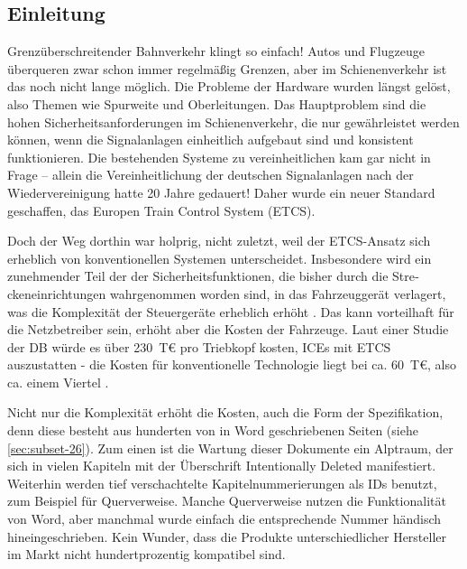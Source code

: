 \documentclass[twoside]{article}
\begin{document}
\begin{multicols}{2}
\noindent 

\section{Einleitung}

Grenzüberschreitender Bahnverkehr klingt so einfach! Autos und Flugzeuge überqueren zwar schon immer regelmäßig Grenzen, aber im Schienenverkehr ist das noch nicht lange möglich.  Die Probleme der Hardware wurden längst gelöst, also Themen wie Spurweite und Oberleitungen.  Das Hauptproblem sind die hohen Sicherheitsanforderungen im Schienenverkehr, die nur gewährleistet werden können, wenn die Signalanlagen einheitlich aufgebaut sind und konsistent funktionieren.  Die bestehenden Systeme zu vereinheitlichen kam gar nicht in Frage -- allein die Vereinheitlichung der deutschen Signalanlagen nach der Wiedervereinigung hatte 20 Jahre gedauert!  Daher wurde ein neuer Standard geschaffen, das Europen Train Control System (ETCS).

Doch der Weg dorthin war holprig, nicht zuletzt, weil der ETCS-Ansatz sich erheblich von konventionellen Systemen unterscheidet.  Insbesondere wird ein zunehmender Teil der der Sicher­heitsfunktionen, die bisher durch die Stre­ckeneinrichtungen wahrgenommen worden sind, in das Fahrzeuggerät verlagert, was die Komplexität der Steuergeräte erheblich erhöht \cite{Hase2011}.  Das kann vorteilhaft für die Netzbetreiber sein, erhöht aber die Kosten der Fahrzeuge.  Laut einer Studie der DB würde es über 230~T€ pro Triebkopf kosten, ICEs mit ETCS auszustatten - die Kosten für konventionelle Technologie liegt bei ca. 60~T€, also ca. einem Viertel \cite{Hase2009}.

Nicht nur die Komplexität erhöht die Kosten, auch die Form der Spezifikation, denn diese besteht aus hunderten von in Word geschriebenen Seiten (siehe \ref{sec:subset-26}).  Zum einen ist die Wartung dieser Dokumente ein Alptraum, der sich in vielen Kapiteln mit der Überschrift \glqq{}Intentionally Deleted\grqq{} manifestiert. Weiterhin werden tief verschachtelte Kapitelnummerierungen als IDs benutzt, zum Beispiel für Querverweise.  Manche Querverweise nutzen die Funktionalität von Word, aber manchmal wurde einfach die entsprechende Nummer händisch hineingeschrieben.  Kein Wunder, dass die Produkte unterschiedlicher Hersteller im Markt nicht hundertprozentig kompatibel sind.


\end{multicols}
\end{document}
